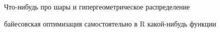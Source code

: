 \begin{problem}
	Что-нибудь про шары и гипергеометрическое распределение 
	\begin{sol} 
		
	\end{sol} 
\end{problem}


\begin{problem}
	байесовская оптимизация самостоятельно в R какой-нибудь функции 
	\begin{sol} 
		
	\end{sol} 
\end{problem}


 \begin{problem}
 	
 	\begin{sol} 
 		
 	\end{sol} 
 \end{problem}


% 


